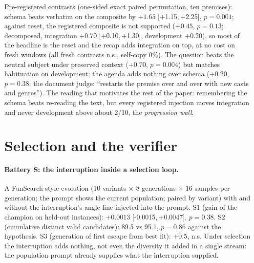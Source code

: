 \documentclass[11pt]{article}
\newcommand{\ci}[2]{[#1,\,#2]}
\begin{document}
Pre-registered contrasts (one-sided exact paired permutation, ten
premises): schema beats verbatim on the composite by $+1.65$
\ci{+1.15}{+2.25}, $p=0.001$; against reset, the registered composite is
not supported ($+0.45$, $p=0.13$; decomposed, integration $+0.70$
\ci{+0.10}{+1.30}, development $+0.20$), so most of the headline is the
reset and the recap adds integration on top, at no cost on fresh windows
(all fresh contrasts n.s., self-copy 0\%). The question beats the
neutral subject under preserved context ($+0.70$, $p=0.004$) but matches
habituation on development; the agenda adds nothing over schema
($+0.20$, $p=0.38$; the document judge: ``restarts the premise over and
over with new casts and genres''). The reading that motivates the rest
of the paper: remembering the schema beats re-reading the text, but
every registered injection moves integration and never development above
about 2/10, the \emph{progression wall}.

\section{Selection and the verifier}
\label{sec:selection}

\paragraph{Battery S: the interruption inside a selection loop.} A
FunSearch-style evolution (10 variants $\times$ 8 generations $\times$ 16
samples per generation; the prompt shows the current population; paired by
variant) with and without the interruption's angle line injected into the
prompt. S1 (gain of the champion on held-out instances): $+0.0013$
\ci{-0.0015}{+0.0047}, $p=0.38$. S2 (cumulative distinct valid candidates):
89.5 vs 95.1, $p=0.86$ against the hypothesis. S3 (generation of first
escape from best fit): $+0.5$, n.s. Under selection the interruption adds
nothing, not even the diversity it added in a single stream: the population
prompt already supplies what the interruption supplied.
\end{document}

